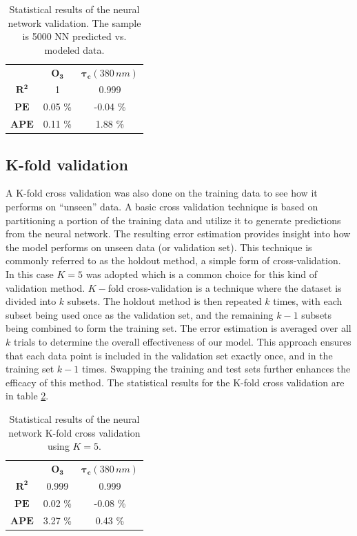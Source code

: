 \documentclass{optica-article}
\begin{document}
\begin{table}[H]	
	\centering
	\begin{tabular}{|c|c||c|}
		\hline
		& \textbf{O}$\bm{_3}$ & $\bm{\tau_c} {\scriptstyle(380 \, nm)}$  \\
		\Xhline{2\arrayrulewidth}
		$\bm{R^2}$	& 1 & 0.999 \\
		\hline
		$\bm{PE}$	& 0.05 \% & -0.04 \% \\
		\hline
		$\bm{APE}$	& 0.11 \%  & 1.88 \%  \\
		\hline
	\end{tabular}
	\caption{Statistical results of the neural network validation. The sample is 5000  NN predicted vs. modeled data.}
	\label{tab:nn_statistics}
\end{table}


\subsection{K-fold validation}

A K-fold cross validation was also done on the training data to see how it performs on ``unseen'' data. 
A basic cross validation technique is based on partitioning a portion of the training data and utilize it to generate predictions from the neural network. 
The resulting error estimation provides insight into how the model performs on unseen data (or validation set). 
This technique is commonly referred to as the holdout method, a simple form of cross-validation.
In this case $K=5$ was adopted which is a common choice for this kind of validation method.
$K-$fold cross-validation is a technique where the dataset is divided into $k$ subsets. 
The holdout method is then repeated $k$ times, with each subset being used once as the validation set, and the remaining $k-1$ subsets being combined to form the training set. 
The error estimation is averaged over all $k$ trials to determine the overall effectiveness of our model. 
This approach ensures that each data point is included in the validation set exactly once, and in the training set $k-1$ times.  
Swapping the training and test sets further enhances the efficacy of this method. 
The statistical results  for the K-fold cross validation are in table \ref{tab:nn_crossvalidation}.


\begin{table}[H]	
	\centering
	\begin{tabular}{|c|c||c|}
		\hline
		& \textbf{O}$\bm{_3}$  & $\bm{\tau_c} {\scriptstyle (380 \, nm)}$  \\
		\Xhline{2\arrayrulewidth}
		$\bm{R^2}$	& 0.999 & 0.999 \\
		\hline
		$\bm{PE}$	& 0.02 \% & -0.08 \% \\
		\hline
		$\bm{APE}$	& 3.27 \%  & 0.43 \%  \\
		\hline
	\end{tabular}
	\caption{Statistical results of the neural network K-fold cross validation using {$K=5$}.}
	\label{tab:nn_crossvalidation}
\end{table}
\end{document}
